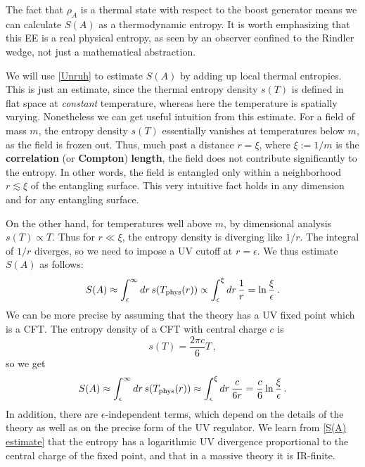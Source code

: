 \documentclass[11pt]{article}
\begin{document}
The fact that $\rho_A$ is a thermal state with respect to the boost generator means we can calculate $S(A)$ as a thermodynamic entropy. It is worth emphasizing that this EE is a real physical entropy, as seen by an observer confined to the Rindler wedge, not just a mathematical abstraction.

We will use \eqref{Unruh} to estimate $S(A)$ by adding up local thermal entropies. This is just an estimate, since the thermal entropy density $s(T)$ is defined in flat space at \emph{constant} temperature, whereas here the temperature is spatially varying. Nonetheless we can get useful intuition from this estimate. For a field of mass $m$, the entropy density $s(T)$ essentially vanishes at temperatures below $m$, as the field is frozen out. Thus, much past a distance $r=\xi$, where $\xi:=1/m$ is the \textbf{correlation} (or \textbf{Compton}) \textbf{length}, the field does not contribute significantly to the entropy. In other words, the field is entangled only within a neighborhood $r\lesssim\xi$ of the entangling surface. This very intuitive fact holds in any dimension and for any entangling surface.

On the other hand, for temperatures well above $m$, by dimensional analysis $s(T)\propto T$. Thus for $r\ll\xi$, the entropy density is diverging like $1/r$. The integral of $1/r$ diverges, so we need to impose a UV cutoff at $r=\epsilon$. We thus estimate $S(A)$ as follows:
\begin{equation}\label{S(A) estimate1}
S(A) \approx \int_\epsilon^\infty dr\,s(T_{\rm phys}(r)) \propto\int_\epsilon^\xi dr\,\frac 1r=\ln\frac\xi\epsilon\,.
\end{equation}
We can be more precise by assuming that the theory has a UV fixed point which is a CFT. The entropy density of a CFT with central charge $c$ is
\begin{equation}
s(T) = \frac{2\pi c}6T\,,
\end{equation}
so we get
\begin{equation}\label{S(A) estimate}
S(A) \approx \int_\epsilon^\infty dr\,s(T_{\rm phys}(r)) \approx\int_\epsilon^\xi dr\,\frac c{6r}=\frac c6\ln\frac\xi\epsilon\,.
\end{equation}
In addition, there are $\epsilon$-independent terms, which depend on the details of the theory as well as on the precise form of the UV regulator. We learn from \eqref{S(A) estimate} that the entropy has a logarithmic UV divergence proportional to the central charge of the fixed point, and that in a massive theory it is IR-finite.
\end{document}
